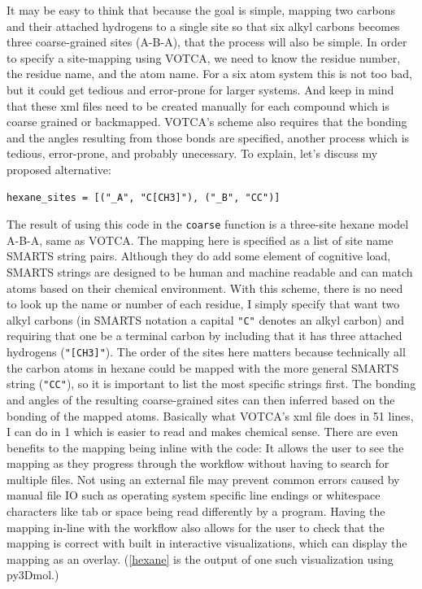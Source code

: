 It may be easy to think that because the goal is simple, mapping two carbons and their attached hydrogens to a single site so that six alkyl carbons becomes three coarse-grained sites (A-B-A), that the process will also be simple.
In order to specify a site-mapping using VOTCA, we need to know the residue number, the residue name, and the atom name.
For a six atom system this is not too bad, but it could get tedious and error-prone for larger systems.
And keep in mind that these xml files need to be created manually for each compound which is coarse grained or  backmapped.
VOTCA's scheme also requires that the bonding and the angles resulting from those bonds are specified, another process which is tedious, error-prone, and probably unecessary. 
To explain, let's discuss my proposed alternative:
\begin{lstlisting}
hexane_sites = [("_A", "C[CH3]"), ("_B", "CC")]
\end{lstlisting}
The result of using this code in the \lstinline{coarse} function is a three-site hexane model A-B-A, same as VOTCA\cite{grits}.
The mapping here is specified as a list of site name SMARTS string pairs.
Although they do add some element of cognitive load, SMARTS strings are designed to be human and machine readable and can match atoms based on their chemical environment.
With this scheme, there is no need to look up the name or number of each residue, I simply specify that want two alkyl carbons (in SMARTS notation a capital \lstinline{"C"} denotes an alkyl carbon) and requiring that one be a terminal carbon by including that it has three attached hydrogens (\lstinline{"[CH3]"}).
The order of the sites here matters because technically all the carbon atoms in hexane could be mapped with the more general SMARTS string (\lstinline{"CC"}), so it is important to list the most specific strings first.
The bonding and angles of the resulting coarse-grained sites can then inferred based on the bonding of the mapped atoms.
Basically what VOTCA's xml file does in 51 lines, I can do in 1 which is easier to read and makes chemical sense. 
There are even benefits to the mapping being inline with the code:
It allows the user to see the mapping as they progress through the workflow without having to search for multiple files.
Not using an external file may prevent common errors caused by manual file IO such as operating system specific line endings or whitespace characters like tab or space being read differently by a program.
Having the mapping in-line with the workflow also allows for the user to check that the mapping is correct with built in interactive visualizations, which can display the mapping as an overlay. 
(\autoref{hexane} is the output of one such visualization using py3Dmol\cite{py3dmol}.)

